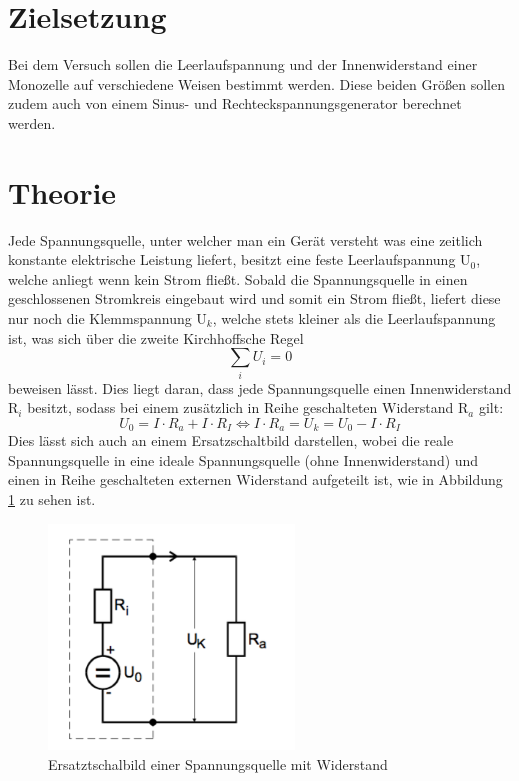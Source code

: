 \section{Zielsetzung}
Bei dem Versuch sollen die Leerlaufspannung und der Innenwiderstand einer Monozelle
auf verschiedene Weisen bestimmt werden. Diese beiden Größen sollen zudem auch von
einem Sinus- und Rechteckspannungsgenerator berechnet werden.

\section{Theorie}
Jede Spannungsquelle, unter welcher man ein Gerät versteht was eine zeitlich konstante
elektrische Leistung liefert, besitzt eine feste Leerlaufspannung $\text{U}_0$, welche
anliegt wenn kein Strom fließt. Sobald die Spannungsquelle in einen geschlossenen
Stromkreis eingebaut wird und somit ein Strom fließt,
liefert diese nur noch die Klemmspannung $\text{U}_k$, welche stets kleiner als
die Leerlaufspannung ist, was sich über die zweite Kirchhoffsche Regel
\begin{equation}
  \sum_i U_i = 0
\end{equation}
beweisen lässt. Dies liegt daran, dass jede Spannungsquelle einen Innenwiderstand
$\text{R}_i$ besitzt, sodass bei einem zusätzlich in Reihe geschalteten Widerstand
$\text{R}_a$ gilt:
\begin{equation}
  U_0 = I\cdot R_a + I\cdot R_I \iff I\cdot R_a = U_k = U_0 - I\cdot R_I
  \label{eqn:formel}
\end{equation}
Dies lässt sich auch an einem Ersatzschaltbild darstellen, wobei die reale
Spannungsquelle in eine ideale Spannungsquelle (ohne Innenwiderstand) und einen
in Reihe geschalteten externen Widerstand aufgeteilt ist, wie in Abbildung
\ref{fig:schalt1} zu sehen ist.
\begin{figure}[H]
  \centering
  \includegraphics[height=6cm]{schalt1.png}
  \caption{Ersatztschalbild einer Spannungsquelle mit Widerstand \cite{skript}}
  \label{fig:schalt1}
\end{figure}
